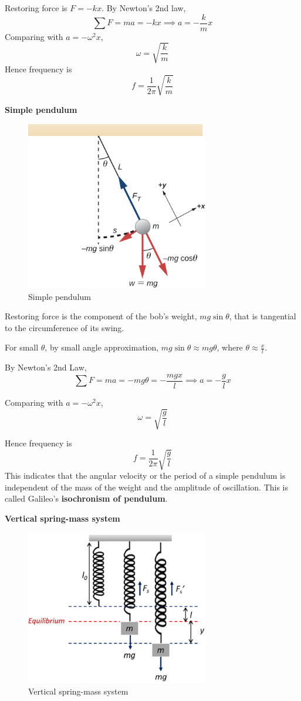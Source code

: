 Restoring force is $F=-kx$. By Newton's 2nd law, 
\[ \sum F=ma=-kx \implies a=-\frac{k}{m}x \]
Comparing with $a=-\omega^2x$,
\[ \omega = \sqrt{\frac{k}{m}} \]
Hence frequency is
\[ f=\frac{1}{2\pi}\sqrt{\frac{k}{m}} \]
\pagebreak

\textbf{Simple pendulum}

\begin{figure}[H]
    \centering
    \includegraphics[width=8cm]{images/simple_pendulum_shm.jpg}
    \caption{Simple pendulum}
\end{figure}

Restoring force is the component of the bob's weight, $mg\sin\theta$, that is tangential to the circumference of its swing. 

For small $\theta$, by small angle approximation, $mg\sin\theta \approx mg\theta$, where $\theta\approx\frac{x}{l}$.

By Newton's 2nd Law, 
\[ \sum F=ma=-mg\theta=-\frac{mgx}{l} \implies a=-\frac{g}{l}x \]

Comparing with $a=-\omega^2x$,
\[ \omega=\sqrt{\frac{g}{l}} \]

Hence frequency is
\[ f=\frac{1}{2\pi}\sqrt{\frac{g}{l}} \]
This indicates that the angular velocity or the period of a simple pendulum is independent of the mass of the weight and the amplitude of oscillation. This is called Galileo's \textbf{isochronism of pendulum}.
\pagebreak

\textbf{Vertical spring-mass system}

\begin{figure}[H]
    \centering
    \includegraphics[width=8cm]{images/vertical_spring_mass_shm.png}
    \caption{Vertical spring-mass system}
\end{figure}

